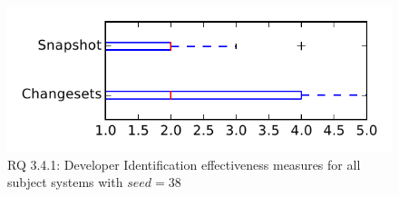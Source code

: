 
\begin{figure}
\centering
\includegraphics[height=0.4\textheight]{figures/dit_seed/rq1_tiny_38}
\caption{RQ 3.4.1: Developer Identification effectiveness measures for all subject systems with $seed=38$}
\label{fig:dit_seed:rq1:tiny}
\end{figure}
